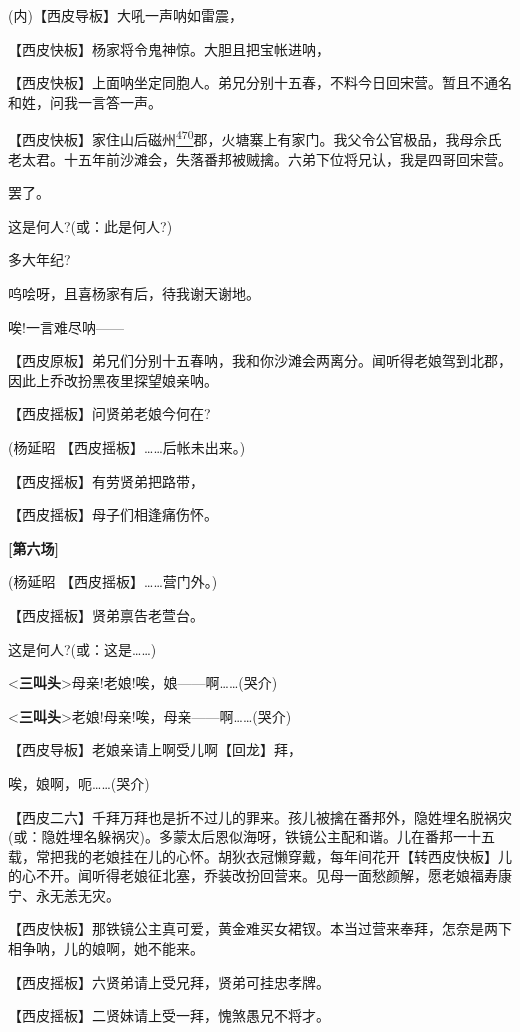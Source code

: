 (内)【西皮导板】大吼一声呐如雷震，

【西皮快板】杨家将令鬼神惊。大胆且把宝帐进呐，

【西皮快板】上面呐坐定同胞人。弟兄分别十五春，不料今日回宋营。暂且不通名和姓，问我一言答一声。

【西皮快板】家住山后磁州\protect\hyperlink{fn470}{\textsuperscript{470}}郡，火塘寨上有家门。我父令公官极品，我母佘氏老太君。十五年前沙滩会，失落番邦被贼擒。六弟下位将兄认，我是四哥回宋营。

罢了。

这是何人?(或：此是何人?)

多大年纪?

呜哙呀，且喜杨家有后，待我谢天谢地。

唉!一言难尽呐------

【西皮原板】弟兄们分别十五春呐，我和你沙滩会两离分。闻听得老娘驾到北郡，因此上乔改扮黑夜里探望娘亲呐。

【西皮摇板】问贤弟老娘今何在?

(杨延昭 【西皮摇板】\ldots{}\ldots{}后帐未出来。)

【西皮摇板】有劳贤弟把路带，

【西皮摇板】母子们相逢痛伤怀。

\textbf{{[}第六场{]}}

(杨延昭 【西皮摇板】\ldots{}\ldots{}营门外。)

【西皮摇板】贤弟禀告老萱台。

这是何人?(或：这是\ldots{}\ldots{})

\textless{}\textbf{三叫头}\textgreater{}母亲!老娘!唉，娘------啊\ldots{}\ldots{}(哭介)

\textless{}\textbf{三叫头}\textgreater{}老娘!母亲!唉，母亲------啊\ldots{}\ldots{}(哭介)

【西皮导板】老娘亲请上啊受儿啊【回龙】拜，

唉，娘啊，呃\ldots{}\ldots{}(哭介)

【西皮二六】千拜万拜也是折不过儿的罪来。孩儿被擒在番邦外，隐姓埋名脱祸灾(或：隐姓埋名躲祸灾)。多蒙太后恩似海呀，铁镜公主配和谐。儿在番邦一十五载，常把我的老娘挂在儿的心怀。胡狄衣冠懒穿戴，每年间花开【转西皮快板】儿的心不开。闻听得老娘征北塞，乔装改扮回营来。见母一面愁颜解，愿老娘福寿康宁、永无恙无灾。

【西皮快板】那铁镜公主真可爱，黄金难买女裙钗。本当过营来奉拜，怎奈是两下相争呐，儿的娘啊，她不能来。

【西皮摇板】六贤弟请上受兄拜，贤弟可挂忠孝牌。

【西皮摇板】二贤妹请上受一拜，愧煞愚兄不将才。

